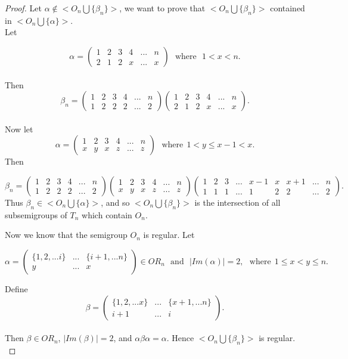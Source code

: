 \documentclass[10pt]{extarticle}
\numberwithin{equation}{section}
\numberwithin{bbb}{section}
\numberwithin{equation}{section}
\begin{document}
\begin{proof}
   Let $\alpha \notin <O_n \bigcup \{\beta_n\}>$, we want to prove that $<O_n \bigcup \{\beta_n\}>$ contained in $<O_n \bigcup \{\alpha\}>$.\\[10pt] 
   Let  
   
   $$\alpha=\begin{pmatrix}  1&2&3&4&...&n\\2&1&2&x&...&x
  \end{pmatrix} \ \ \ \text{where} \ \ \ 1<x<n.$$\\[10pt]
  Then
  $$\beta_n=
  \begin{pmatrix}  1&2&3&4&...&n\\1&2&2&2&...&2
  \end{pmatrix}\begin{pmatrix}  1&2&3&4&...&n\\2&1&2&x&...&x
  \end{pmatrix}.$$\\[10pt]
   Now let 
  $$\alpha=\begin{pmatrix}  1&2&3&4&...&n\\x&y&x&z&...&z
  \end{pmatrix} \ \ \ \text{where} \ \ 1<y\leq x-1<x.$$ 
  Then

  \vspace{0.7cm}
  $\beta_n=
  \begin{pmatrix}  1&2&3&4&...&n\\1&2&2&2&...&2
  \end{pmatrix}\begin{pmatrix}  1&2&3&4&...&n\\x&y&x&z&...&z
  \end{pmatrix}\begin{pmatrix}  1&2&3&...&x-1&x&x+1&...&n\\1&1&1&...&1&2&2&...&2
  \end{pmatrix}.$\\[10pt]
Thus $\beta_n \in <O_n \bigcup \{\alpha\}>$, and so $<O_n \bigcup \{\beta_n\}>$ is the intersection of all subsemigroups of $T_n$ which contain $O_n$.

  \vspace{0.5cm}
 Now we know that the semigroup $O_n$ is regular. Let 
 
 $$\alpha=\begin{pmatrix}  \{1,2,...i\}&...&\{i+1,...n\}\\y&...&x
  \end{pmatrix} \in OR_n \ \ \ \text{and} \ \ \ |Im(\alpha)|=2, \ \ \ \text{where} \ \ 1\leq x<y \leq n.$$ 
  
 Define 
  $$\beta=\begin{pmatrix}  \{1,2,...x\}&...&\{x+1,...n\}\\i+1&...&i
  \end{pmatrix}.$$\\[6pt] 
  Then $\beta \in OR_n$,  $|Im(\beta)|=2$, and $\alpha\beta\alpha=\alpha$. Hence  $<O_n \bigcup \{\beta_n\}>$ is regular.\\
\end{proof}
\end{document}

